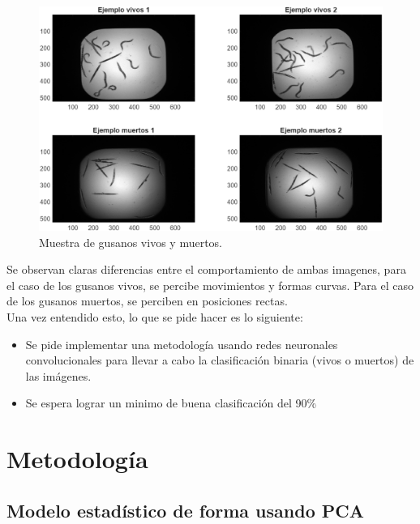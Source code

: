 \documentclass[11pt, letterpaper]{article}
\begin{document}
\begin{figure}[h!]
	\centering
	\begin{minipage}{0.8\textwidth}
		\centering
		\includegraphics[width=\textwidth]{IMG/R1.png}
		\caption*{Muestra de gusanos vivos y muertos.}
	\end{minipage}\hfill
\end{figure}

Se observan claras diferencias entre el comportamiento de ambas imagenes, para el caso de los gusanos vivos, se percibe movimientos y formas curvas. Para el caso de los gusanos muertos, se perciben en posiciones rectas. \\

Una vez entendido esto, lo que se pide hacer es lo siguiente:


\begin{itemize}
	\item Se pide implementar una metodología usando redes neuronales convolucionales para llevar a cabo la clasificación binaria (vivos o muertos) de las imágenes.
	
	\item Se espera lograr un minimo de buena clasificación del 90\%
	
\end{itemize}




	
\newpage
	
\section{Metodología}

\subsection{Modelo estadístico de forma usando PCA}
\end{document}
